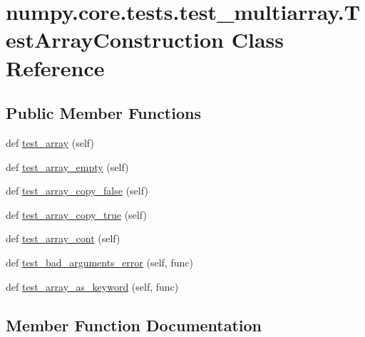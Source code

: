 \hypertarget{classnumpy_1_1core_1_1tests_1_1test__multiarray_1_1TestArrayConstruction}{}\section{numpy.\+core.\+tests.\+test\+\_\+multiarray.\+Test\+Array\+Construction Class Reference}
\label{classnumpy_1_1core_1_1tests_1_1test__multiarray_1_1TestArrayConstruction}
\subsection*{Public Member Functions}
\begin{DoxyCompactItemize}
\item 
def \hyperlink{classnumpy_1_1core_1_1tests_1_1test__multiarray_1_1TestArrayConstruction_a3345e6eb4116fb6a068aa4119c05d2ff}{test\+\_\+array} (self)
\item 
def \hyperlink{classnumpy_1_1core_1_1tests_1_1test__multiarray_1_1TestArrayConstruction_a1a20621b07368e9282fe71c0eb54d237}{test\+\_\+array\+\_\+empty} (self)
\item 
def \hyperlink{classnumpy_1_1core_1_1tests_1_1test__multiarray_1_1TestArrayConstruction_a21ca8c7ef45449a4b37ca9420cf6c333}{test\+\_\+array\+\_\+copy\+\_\+false} (self)
\item 
def \hyperlink{classnumpy_1_1core_1_1tests_1_1test__multiarray_1_1TestArrayConstruction_a1a15f02f67f0b1478e93000e3d899403}{test\+\_\+array\+\_\+copy\+\_\+true} (self)
\item 
def \hyperlink{classnumpy_1_1core_1_1tests_1_1test__multiarray_1_1TestArrayConstruction_a39ea3a9529a17c38b5f2b5c3e5277168}{test\+\_\+array\+\_\+cont} (self)
\item 
def \hyperlink{classnumpy_1_1core_1_1tests_1_1test__multiarray_1_1TestArrayConstruction_a02f7f48f7d30cd447846a73e1ee63109}{test\+\_\+bad\+\_\+arguments\+\_\+error} (self, func)
\item 
def \hyperlink{classnumpy_1_1core_1_1tests_1_1test__multiarray_1_1TestArrayConstruction_adb23b7d0f50bb87c5dbc89dadc0eeb13}{test\+\_\+array\+\_\+as\+\_\+keyword} (self, func)
\end{DoxyCompactItemize}


\subsection{Member Function Documentation}
\mbox{\label{classnumpy_1_1core_1_1tests_1_1test__multiarray_1_1TestArrayConstruction_a3345e6eb4116fb6a068aa4119c05d2ff}} 
